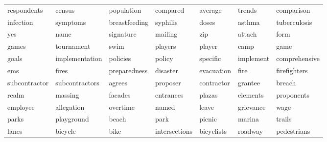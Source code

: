 \begin{table}[ht]
\begin{tabular}{lllllll}
  \cellcolor{blue!10}respondents & \cellcolor{blue!10}census & \cellcolor{blue!10}population & \cellcolor{blue!10}compared & \cellcolor{blue!10}average & \cellcolor{blue!10}trends & \cellcolor{blue!10}comparison \\ 
  \cellcolor{red!20}infection & \cellcolor{red!20}symptoms & \cellcolor{red!20}breastfeeding & \cellcolor{red!20}syphilis & \cellcolor{red!20}doses & \cellcolor{red!20}asthma & \cellcolor{red!20}tuberculosis \\ 
  \cellcolor{red!20}yes & \cellcolor{red!20}name & \cellcolor{red!20}signature & \cellcolor{red!20}mailing & \cellcolor{red!20}zip & \cellcolor{red!20}attach & \cellcolor{red!20}form \\ 
  \cellcolor{red!30}games & \cellcolor{red!30}tournament & \cellcolor{red!30}swim & \cellcolor{red!30}players & \cellcolor{red!30}player & \cellcolor{red!30}camp & \cellcolor{red!30}game \\ 
  \cellcolor{blue!10}goals & \cellcolor{blue!10}implementation & \cellcolor{blue!10}policies & \cellcolor{blue!10}policy & \cellcolor{blue!10}specific & \cellcolor{blue!10}implement & \cellcolor{blue!10}comprehensive \\ 
  \cellcolor{red!20}ems & \cellcolor{red!20}fires & \cellcolor{red!20}preparedness & \cellcolor{red!20}disaster & \cellcolor{red!20}evacuation & \cellcolor{red!20}fire & \cellcolor{red!20}firefighters \\ 
  \cellcolor{red!10}subcontractor & \cellcolor{red!10}subcontractors & \cellcolor{red!10}agrees & \cellcolor{red!10}proposer & \cellcolor{red!10}contractor & \cellcolor{red!10}grantee & \cellcolor{red!10}breach \\ 
  \cellcolor{blue!10}realm & \cellcolor{blue!10}massing & \cellcolor{blue!10}facades & \cellcolor{blue!10}entrances & \cellcolor{blue!10}plazas & \cellcolor{blue!10}elements & \cellcolor{blue!10}proponents \\ 
  \cellcolor{blue!10}employee & \cellcolor{blue!10}allegation & \cellcolor{blue!10}overtime & \cellcolor{blue!10}named & \cellcolor{blue!10}leave & \cellcolor{blue!10}grievance & \cellcolor{blue!10}wage \\ 
  \cellcolor{blue!10}parks & \cellcolor{blue!10}playground & \cellcolor{blue!10}beach & \cellcolor{blue!10}park & \cellcolor{blue!10}picnic & \cellcolor{blue!10}marina & \cellcolor{blue!10}trails \\ 
  \cellcolor{blue!10}lanes & \cellcolor{blue!10}bicycle & \cellcolor{blue!10}bike & \cellcolor{blue!10}intersections & \cellcolor{blue!10}bicyclists & \cellcolor{blue!10}roadway & \cellcolor{blue!10}pedestrians \\ 

\end{tabular}
\end{table}
